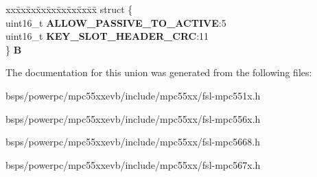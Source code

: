 \begin{DoxyCompactItemize}
\begin{tabbing}
\end{tabbing}\item 
\mbox{\label{unionuPCR12_a2bad4ac3f55efb58ca4b93c6f261d9c4}} 
\begin{tabbing}
xx\=xx\=xx\=xx\=xx\=xx\=xx\=xx\=xx\=\kill
struct \{\\
\>uint16\_t {\bfseries ALLOW\_PASSIVE\_TO\_ACTIVE}:5\\
\>uint16\_t {\bfseries KEY\_SLOT\_HEADER\_CRC}:11\\
\} {\bfseries B}\\

\end{tabbing}\end{DoxyCompactItemize}


The documentation for this union was generated from the following files\+:\begin{DoxyCompactItemize}
\item 
bsps/powerpc/mpc55xxevb/include/mpc55xx/fsl-\/mpc551x.\+h\item 
bsps/powerpc/mpc55xxevb/include/mpc55xx/fsl-\/mpc556x.\+h\item 
bsps/powerpc/mpc55xxevb/include/mpc55xx/fsl-\/mpc5668.\+h\item 
bsps/powerpc/mpc55xxevb/include/mpc55xx/fsl-\/mpc567x.\+h\end{DoxyCompactItemize}
